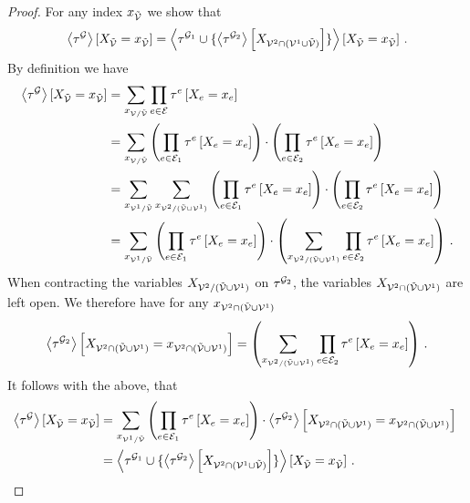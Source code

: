 \begin{proof}
	For any index $x_{\tilde{\mathcal{V}}}$ we show that
	\begin{align*}
		\left\langle \tau^{\mathcal{G}}\right\rangle \left[ X_{\tilde{\mathcal{V}}}=x_{\tilde{\mathcal{V}}} \right]
		=\left\langle \tau^{\mathcal{G}_1} \cup \{
			\left\langle \tau^{\mathcal{G}_2}\right\rangle \left[ X_{\mathcal{V}^{2}\cap(\mathcal{V}^{1}\cup\tilde{\mathcal{V}})} \right]
		\}\right\rangle \left[ X_{\tilde{\mathcal{V}}}=x_{\tilde{\mathcal{V}}} \right]   \, .
	\end{align*}
	By definition we have
	\begin{align*}
		\left\langle \tau^{\mathcal{G}}\right\rangle \left[ X_{\tilde{\mathcal{V}}}=x_{\tilde{\mathcal{V}}} \right]
		& = \sum_{x_{\mathcal{V}/\tilde{\mathcal{V}}}} \prod_{e\in\mathcal{E}} \tau^{e}\left[X_{e}=x_{e}\right] \\
		& = \sum_{x_{\mathcal{V}/\tilde{\mathcal{V}}}}
		 	\left( \prod_{e\in\mathcal{E}_1} \tau^{e}\left[X_{e}=x_{e}\right] \right)
		 	\cdot \left( \prod_{e\in\mathcal{E}_2} \tau^{e}\left[X_{e}=x_{e}\right]  \right) \\
		& =  \sum_{x_{\mathcal{V}^{1}/\tilde{\mathcal{V}}}} \sum_{x_{\mathcal{V}^{2}/(\tilde{\mathcal{V}}\cup\mathcal{V}^{1})}}
			\left( \prod_{e\in\mathcal{E}_1} \tau^{e}\left[X_{e}=x_{e}\right] \right)
		 	\cdot \left( \prod_{e\in\mathcal{E}_2} \tau^{e}\left[X_{e}=x_{e}\right]  \right) \\
		& =  \sum_{x_{\mathcal{V}^{1}/\tilde{\mathcal{V}}}}
			\left( \prod_{e\in\mathcal{E}_1} \tau^{e}\left[X_{e}=x_{e}\right] \right)
		 	\cdot \left( \sum_{x_{\mathcal{V}^{2}/(\tilde{\mathcal{V}}\cup\mathcal{V}^{1})}}  \prod_{e\in\mathcal{E}_2} \tau^{e}\left[X_{e}=x_{e}\right]  \right) \, .
	\end{align*}
	When contracting the variables $X_{\mathcal{V}^{2}/(\tilde{\mathcal{V}}\cup\mathcal{V}^{1})}$ on $\tau^{\mathcal{G}_2}$, the variables $X_{\mathcal{V}^{2}\cap(\tilde{\mathcal{V}}\cup\mathcal{V}^{1})}$ are left open.
	We therefore have for any $x_{\mathcal{V}^{2}\cap(\tilde{\mathcal{V}}\cup\mathcal{V}^{1})}$
	\begin{align*}
		\left\langle \tau^{\mathcal{G}_2}\right\rangle \left[ X_{\mathcal{V}^{2}\cap(\tilde{\mathcal{V}}\cup\mathcal{V}^{1})}=x_{\mathcal{V}^{2}\cap(\tilde{\mathcal{V}}\cup\mathcal{V}^{1})} \right] =
		 \left( \sum_{x_{\mathcal{V}^{2}/(\tilde{\mathcal{V}}\cup\mathcal{V}^{1})}}  \prod_{e\in\mathcal{E}_2} \tau^{e}\left[X_{e}=x_{e}\right]  \right) \, .
	\end{align*}
	It follows with the above, that
	\begin{align*}
		\contractionof{\tnetof{\graph}}{\indexedcatvariableof{\secnodes}}
		& =  \sum_{\catindexof{\nodesone/\secnodes}}  \left( \prod_{\edge\in\edges_1} \hypercoreofat{\edge}{\indexedcatvariableof{\edge}} \right) \cdot \contractionof{\tnetof{\graph_2}}{\indexedcatvariableof{\nodestwo\cap(\secnodes\cup\nodesone)}} \\
		& = \contractionof{\tnetof{\graph_1} \cup \{
			\contractionof{\tnetof{\graph_2}}{\catvariableof{\nodestwo\cap(\nodesone\cup\secnodes)}}
		\}}{\indexedcatvariableof{\secnodes}}   \, .
	\end{align*}
\end{proof}


